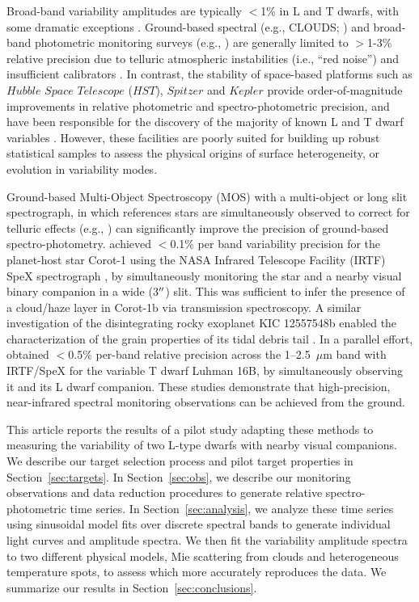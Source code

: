 \documentclass[twocolumn]{aastex6}
\begin{document}
Broad-band variability amplitudes are typically $<$1\% in L and T dwarfs, with some dramatic exceptions \citep{2009ApJ...701.1534A,2012ApJ...750..105R,2013A&A...555L...5G,2016ApJ...829L..32L}. 
Ground-based spectral (e.g., CLOUDS; \citealt{2008A&A...487..277G}) and broad-band photometric monitoring surveys (e.g., \citealt{1999A&A...348..800B,2003MNRAS.346..473K,2014ApJ...793...75R,2014A&A...566A.111W}) are generally limited to $>$1-3\% relative precision due to telluric atmospheric instabilities (i.e., ``red noise'') and insufficient calibrators \citep{2003MNRAS.339..477B}.
In contrast, the stability of space-based platforms such as $Hubble$ $Space$ $Telescope$ ($HST$), $Spitzer$ and $Kepler$ provide order-of-magnitude improvements in relative photometric and spectro-photometric precision, and have been responsible for the discovery of the majority of known L and T dwarf variables \citep{2013ApJ...768..121A,2013ApJ...779..172G,2015ApJ...799..154M}. However, these facilities are poorly suited for building up robust statistical samples to assess the physical origins of surface heterogeneity, or evolution in variability modes. 

Ground-based Multi-Object Spectroscopy (MOS) with a multi-object or long slit spectrograph, in which references stars are simultaneously observed to correct for telluric effects  (e.g., \citealt{bean10,bean2013,gibson13clouds,stevenson2016hatp26}) can significantly improve the precision of ground-based spectro-photometry. \citet{2014ApJ...783....5S} achieved $<$0.1\% per band variability precision for the planet-host star Corot-1 using the NASA Infrared Telescope Facility (IRTF) SpeX spectrograph \citep{2003PASP..115..362R}, by simultaneously monitoring the star and a nearby visual binary companion in a wide (3$\mbox{$^{\prime\prime}$}$) slit. This was sufficient to infer the presence of a cloud/haze layer in Corot-1b via transmission spectroscopy. A similar investigation of the disintegrating rocky exoplanet KIC 12557548b  enabled the characterization of the grain properties of its tidal debris tail \citep{2016ApJ...826..156S}. In a parallel effort, \citet{2014ApJ...785...48B} obtained $<$0.5\% per-band relative precision across the 1--2.5~$\mu$m band with IRTF/SpeX for the variable T dwarf Luhman 16B, by simultaneously observing it and its L dwarf companion. These studies demonstrate that high-precision, near-infrared spectral monitoring observations can be achieved from the ground.

This article reports the results of a pilot study adapting these methods to measuring the variability of two L-type dwarfs with nearby visual companions. We describe our target selection process and pilot target properties in Section~\ref{sec:targets}.
In Section~\ref{sec:obs}, we describe our monitoring observations and data reduction procedures to generate relative spectro-photometric time series.
In Section~\ref{sec:analysis}, we analyze these time series using sinusoidal model fits over discrete spectral bands to generate individual light curves and amplitude spectra.
We then fit the variability amplitude spectra to two different physical models, Mie scattering from clouds and heterogeneous temperature spots, to assess which more accurately reproduces the data.
We summarize our results in Section~\ref{sec:conclusions}.
\end{document}
